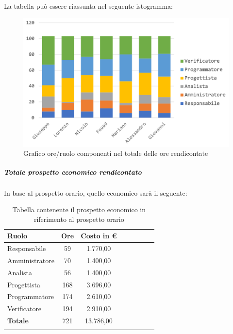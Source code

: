 				La tabella può essere riassunta nel seguente istogramma:
				\begin{figure}[H]
					\centering
					\includegraphics[width=0.8\linewidth]{./images/preventivo/totOreRed1.png}
					\caption{Grafico ore/ruolo componenti nel totale delle ore rendicontate}
					\label{fig:grafico suddivione ruoli totale ore rendicontete}
				\end{figure}
			
				\subparagraph{Totale prospetto economico rendicontato}
				In base al prospetto orario, quello economico sarà il seguente: 
				
				\begin{longtable}{|l|c|c|c|c|c|c|c|}
					\hline
					\rowcolor{lighter-grayer}
					\textbf{Ruolo} & \textbf{Ore} & \textbf{Costo in €} \\
					\hline
					\endfirsthead
					
					\hline
					Responsabile 	    & 59 & 1.770,00\\
					\hline 
					\hline
					Amministratore	  & 70 & 1.400,00\\
					\hline
					\hline
					Analista 				& 56 & 1.400,00\\
					\hline
					\hline
					Progettista 		  & 168 & 3.696,00\\
					\hline
					\hline
					Programmatore 	 & 174 & 2.610,00\\
					\hline
					\hline
					Verificatore 		  & 194 & 2.910,00\\
					\hline
					\textbf{Totale} 	& 721 & 13.786,00\\
					\hline
					\caption{Tabella contenente il prospetto economico in riferimento al prospetto orario}
				\end{longtable}
				\pagebreak
				
